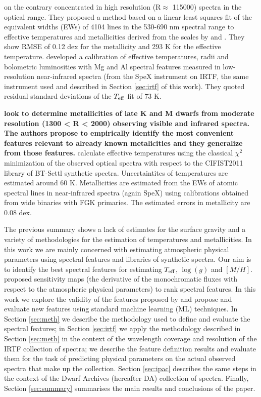 \cite{2014A&A...568A.121N} on the contrary concentrated in
high resolution (R$\approx$ 115000) spectra in the optical range.
They proposed a method based on a linear least squares fit of the
equivalent widths (EWs) of 4104 lines in the 530-690 nm spectral range
to effective temperatures and metallicities derived from the scales
by \cite{2012A&A...538A..25N} and \cite{2008MNRAS.389..585C}.  They
show RMSE of 0.12 dex for the metallicity and 293 K for the effective
temperature. \cite{2015ApJ...800...85N} developed a calibration of
effective temperatures, radii and bolometric luminosities with Mg and
Al spectral features measured in low-resolution near-infrared spectra
(from the SpeX instrument on IRTF, the same instrument used and
described in Section \ref{sec:irtf} of this work).  They quoted 
residual standard deviations of the $T_{\rm eff}$ fit of 73
K.

\textbf{
\cite{2013AJ....145...52M} look to determine metallicities of 
late K and M dwarfs from moderate resolution (1300 < R < 2000) 
observing visible and infrared spectra. The authors propose to 
empirically identify the most convenient features relevant 
to already known metalicities and they generalize from those features.
}
\cite{Mann2015} calculate effective temperatures using the
classical $\chi^2$ minimization of the observed optical spectra with
respect to the CIFIST2011 library of BT-Settl synthetic spectra.
Uncertaintites of temperatures are estimated around 60 K.
Metallicities are estimated from the EWs of atomic spectral lines in
near-infrared spectra (again SpeX) using calibrations obtained from
wide binaries with FGK primaries. The estimated errors in metallicity
are 0.08 dex.

The previous summary shows a lack of estimates for the surface gravity
and a variety of methodologies for the estimation of temperatures and
metallicities. In this work we are mainly concerned with estimating
atmospheric physical parameters using spectral features and libraries
of synthetic spectra. Our aim is to identify the best spectral
features for estimating $T_{\rm eff}$, $\log(g)$ and
$[M/H]$. \cite{cesetti} proposed sensitivity maps (the derivative
of the monochromatic fluxes with respect to the atmospheric physical
parameters) to rank spectral features. In this work we explore the
validity of the features proposed by \cite{cesetti} and propose and
evaluate new features using standard machine learning (ML) techniques. In
Section \ref{sec:meth} we describe the methodology used to define and
evaluate the spectral features; in Section \ref{sec:irtf} we apply the
methodology described in Section \ref{sec:meth} in the context of the
wavelength coverage and resolution of the IRTF collection of spectra;
we describe the feature definition results and evaluate them for the
task of predicting physical parameters on the actual observed spectra
that make up the collection. Section \ref{sec:ipac} describes the same
steps in the context of the Dwarf Archives (hereafter DA) collection
of spectra. Finally, Section \ref{sec:summary} summarises the main
results and conclusions of the paper.
